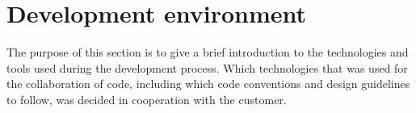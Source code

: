 \newpage
\section{Development environment}
The purpose of this section is to give a brief introduction to the technologies and tools used during the development process. Which technologies that was used for the collaboration of code, including which code conventions and design guidelines to follow, was decided in cooperation with the customer.






